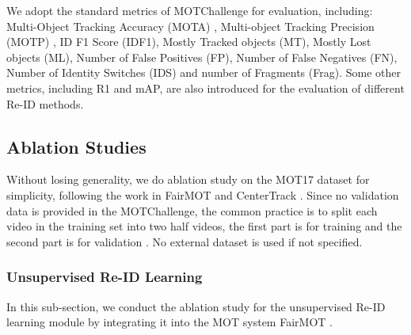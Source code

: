 \documentclass[final,1p,times,twocolumn]{elsarticle}
\begin{document}
	We adopt the standard metrics of MOTChallenge for evaluation, including:
	Multi-Object Tracking Accuracy (MOTA) \cite{bernardin2008evaluating},
	Multi-object Tracking Precision (MOTP) \cite{bernardin2008evaluating},
	ID F1 Score (IDF1),
	Mostly Tracked objects (MT),
	Mostly Lost objects (ML),
	Number of False Positives (FP),
	Number of False Negatives (FN),
	Number of Identity Switches (IDS) \cite{li2009learning} and number of Fragments (Frag).
	Some other metrics, including R1 and mAP, are also introduced for the evaluation of different Re-ID methods.
	
	\subsection{Ablation Studies}
	Without losing generality, we do ablation study on the MOT17 dataset for simplicity, following the work in FairMOT \cite{zhang2020fairmot} and CenterTrack \cite{zhou2020tracking}. Since no validation data is provided in the MOTChallenge, the common practice is to split each video in the training set into two half videos, the first part is for training and the second part is for validation \cite{zhang2020fairmot, zhou2020tracking, saleh2021probabilistic, wang2021multiple, wu2021track}. No external dataset is used if not specified.
	
	
	\subsubsection{Unsupervised Re-ID Learning}
	\label{section_experiments_unsupervised_reid_learning}
	In this sub-section, we conduct the ablation study for the unsupervised Re-ID learning module by integrating it into the MOT system FairMOT \cite{zhang2020fairmot}.
	
\end{document}
